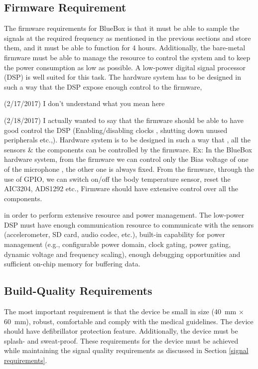 \subsection{Firmware Requirement }

The firmware requirements for BlueBox is that it must be able to
sample the signals at the required frequency as mentioned in the
previous sections and store them, and it must be able to function for
4 hours. Additionally, the bare-metal firmware must be able to manage
the resource to control the system and to keep the power consumption
as low as possible. A low-power digital signal processor (DSP) is
well suited for this task. The hardware system has to be designed in
such a way that the DSP expose enough control to the firmware,
\begin{cmtPai}
	(2/17/2017) I don't understand what you mean here
\end{cmtPai}
\begin{cmtSMS}
	(2/18/2017) I actually wanted to say that the firmware should be able to have good control the DSP (Enabling/disabling clocks , shutting down unused peripherals etc.,). Hardware system is to be designed in such a way that , all the sensors \& the components can be controlled by the firmware.
	Ex: In the BlueBox hardware system, from the firmware we can control only the Bias voltage of one of the microphone , the other one is always fixed.
	From the firmware, through the use of GPIO, we can switch on/off the body temperature sensor, reset the AIC3204, ADS1292 etc.,
	Firmware should have extensive control over all the components.	
	 
\end{cmtSMS}
in order to perform extensive resource and power management. The
low-power DSP must have enough communication resource to communicate
with the sensors (accelerometer, SD card, audio codec, etc.),
built-in capability for power management (e.g., configurable power
domain, clock gating, power gating, dynamic voltage and frequency
scaling), enough debugging opportunities and sufficient on-chip
memory for buffering data. 

\subsection {Build-Quality Requirements} 

The most important requirement is that the device be small in size
(40~mm $\times$ 60~mm), robust, comfortable and comply with the
medical guidelines. The device should have defibrillator protection
feature.  Additionally, the device must be splash- and sweat-proof.
These requirements for the device must be achieved while maintaining
the signal quality requirements as discussed in Section \ref{signal
requirements}.  

